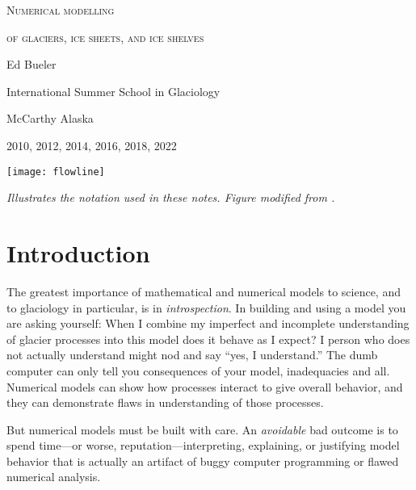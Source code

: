 \documentclass[letterpaper,final,12pt,reqno]{amsart}
\begin{document}
\graphicspath{{../figures/}}

\begin{titlepage}

  \begin{center}
  \phantom{foo}
    \vspace{1.0cm}

     {\Large \textsc{Numerical modelling}}
    \vspace{0.7cm}

     {\Large \textsc{of glaciers, ice sheets, and ice shelves}}

    \vspace{1.5cm}

    {\large Ed Bueler}
    \vspace{1cm}

    International Summer School in Glaciology

    McCarthy Alaska

    2010, 2012, 2014, 2016, 2018, 2022

    \vfill
    
    \texttt{[image: flowline]}
  
    \scriptsize \emph{Illustrates the notation used in these notes.  Figure modified from \cite{SchoofMarine1}.} \normalsize
    
    \vspace{1.5in}
  \end{center}
\end{titlepage}

\clearpage\newpage

\setcounter{page}{2}
\section{Introduction}  \label{sec:intro}

The greatest importance of mathematical and numerical models to science, and to glaciology in particular, is in \emph{introspection}.  In building and using a model you are asking yourself: When I combine my imperfect and incomplete understanding of glacier processes into this model does it behave as I expect?  I person who does not actually understand might nod and say ``yes, I understand.''  The dumb computer can only tell you consequences of your model, inadequacies and all.  Numerical models can show how processes interact to give overall behavior, and they can demonstrate flaws in understanding of those processes.

But numerical models must be built with care.  An \emph{avoidable} bad outcome is to spend time---or worse, reputation---interpreting, explaining, or justifying model behavior that is actually an artifact of buggy computer programming or flawed numerical analysis.
\end{document}
